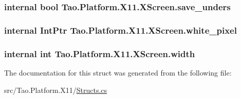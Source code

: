\label{struct_tao_1_1_platform_1_1_x11_1_1_x_screen_abf104f6415f544fd53428d5805a791ae}
\hypertarget{struct_tao_1_1_platform_1_1_x11_1_1_x_screen_a9100f827678759204333781fedeed48c}{
\subsubsection[{save\_\-unders}]{\setlength{\rightskip}{0pt plus 5cm}internal bool {\bf Tao.Platform.X11.XScreen.save\_\-unders}}}
\label{struct_tao_1_1_platform_1_1_x11_1_1_x_screen_a9100f827678759204333781fedeed48c}
\hypertarget{struct_tao_1_1_platform_1_1_x11_1_1_x_screen_a81b6434ac283722f73f5fc94e83df733}{
\subsubsection[{white\_\-pixel}]{\setlength{\rightskip}{0pt plus 5cm}internal IntPtr {\bf Tao.Platform.X11.XScreen.white\_\-pixel}}}
\label{struct_tao_1_1_platform_1_1_x11_1_1_x_screen_a81b6434ac283722f73f5fc94e83df733}
\hypertarget{struct_tao_1_1_platform_1_1_x11_1_1_x_screen_a9918259e4d0f885733f12b72b8dc4a12}{
\subsubsection[{width}]{\setlength{\rightskip}{0pt plus 5cm}internal int {\bf Tao.Platform.X11.XScreen.width}}}
\label{struct_tao_1_1_platform_1_1_x11_1_1_x_screen_a9918259e4d0f885733f12b72b8dc4a12}


The documentation for this struct was generated from the following file:\begin{DoxyCompactItemize}
\item 
src/Tao.Platform.X11/\hyperlink{_structs_8cs}{Structs.cs}\end{DoxyCompactItemize}
